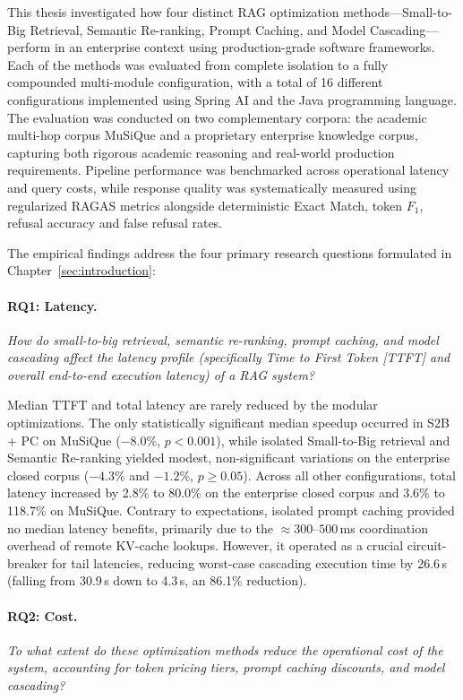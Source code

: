 This thesis investigated how four distinct RAG optimization methods---Small-to-Big Retrieval, Semantic Re-ranking, Prompt Caching, and Model Cascading---perform in an enterprise context using production-grade software frameworks. Each of the methods was evaluated from complete isolation to a fully compounded multi-module configuration, with a total of 16 different configurations implemented using Spring AI and the Java programming language. The evaluation was conducted on two complementary corpora: the academic multi-hop corpus MuSiQue and a proprietary enterprise knowledge corpus, capturing both rigorous academic reasoning and real-world production requirements. Pipeline performance was benchmarked across operational latency and query costs, while response quality was systematically measured using regularized RAGAS metrics alongside deterministic Exact Match, token $F_1$, refusal accuracy and false refusal rates. 

The empirical findings address the four primary research questions formulated in Chapter~\ref{sec:introduction}:

\paragraph{RQ1: Latency.} \textit{How do small-to-big retrieval, semantic re-ranking, prompt caching, and model cascading affect the latency profile (specifically Time to First Token [TTFT] and overall end-to-end execution latency) of a RAG system?}

Median TTFT and total latency are rarely reduced by the modular optimizations. The only statistically significant median speedup occurred in S2B + PC on MuSiQue ($-8.0\%$, $p < 0.001$), while isolated Small-to-Big retrieval and Semantic Re-ranking yielded modest, non-significant variations on the enterprise closed corpus ($-4.3\%$ and $-1.2\%$, $p \ge 0.05$). Across all other configurations, total latency increased by 2.8\% to 80.0\% on the enterprise closed corpus and 3.6\% to 118.7\% on MuSiQue. Contrary to expectations, isolated prompt caching provided no median latency benefits, primarily due to the $\approx 300\text{--}500$\,ms coordination overhead of remote KV-cache lookups. However, it operated as a crucial circuit-breaker for tail latencies, reducing worst-case cascading execution time by 26.6\,s (falling from 30.9\,s down to 4.3\,s, an 86.1\% reduction).

\paragraph{RQ2: Cost.} \textit{To what extent do these optimization methods reduce the operational cost of the system, accounting for token pricing tiers, prompt caching discounts, and model cascading?}

